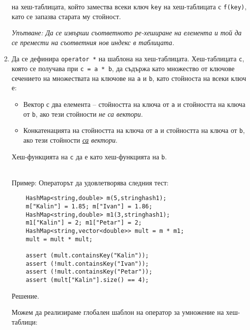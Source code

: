 \documentclass[12pt,a4paper]{article}
\begin{document}
\begin{enumerate}
		на хеш-таблицата, който замества всеки ключ \texttt{key} на хеш-таблицата с \texttt{f(key)}, като се запазва старата му стойност.

		\emph{Упътване: Да се извърши съответното ре-хеширане на елемента и той да се премести на съответния нов индекс в таблицата.}


		\item Да се дефинира \texttt{operator *} на шаблона на хеш-таблицата. Хеш-таблицата \texttt{c}, която се получава при \texttt{c = a * b}, да съдържа като множество от ключове сечението на множествата на ключове на \texttt{a} и \texttt{b}, като стойноста на всеки ключ е:

		\begin{itemize}
			\item Вектор с два елемента -- стойността на ключа от \texttt{a} и стойността на ключа от \texttt{b}, ако тези стойности \emph{не са вектори}.
			\item Конкатенацията на стойността на ключа от \texttt{a} и стойността на ключа от \texttt{b}, ако тези стойности \emph{\underline{са} вектори}.
		\end{itemize}

		Хеш-функцията на \texttt{c} да е като хеш-функцията на \texttt{b}.
		\\
		\\

		\begin{mdframed}[hidealllines=true,backgroundcolor=gray!20]
		Пример: Операторът да удовлетворява следния тест:

	\begin{lstlisting}
	HashMap<string,double> m(5,stringhash1);
	m["Kalin"] = 1.85; m["Ivan"] = 1.86;
	HashMap<string,double> m1(3,stringhash1);
	m1["Kalin"] = 2; m1["Petar"] = 2;
	HashMap<string,vector<double>> mult = m * m1;
	mult = mult * mult;

	assert (mult.containsKey("Kalin"));
	assert (!mult.containsKey("Ivan"));
	assert (!mult.containsKey("Petar"));
	assert (mult["Kalin"].size() == 4);
	\end{lstlisting}

		\end{mdframed}

		\begin{mdframed}[hidealllines=true,backgroundcolor=gray!20]
		Решение.

		Можем да реализираме глобален шаблон на оператор за умножение на хеш-таблици:


\end{mdframed}
\end{enumerate}
\end{document}
